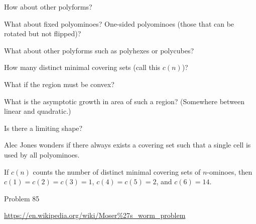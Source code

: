 \documentclass{article}
\begin{document}
\begin{related}
  \item How about other polyforms?
  \item What about fixed polyominoes? One-sided polyominoes (those that can be rotated but not flipped)?
  \item What about other polyforms such as polyhexes or polycubes?
  \item How many distinct minimal covering sets (call this $c(n)$)?
  \item What if the region must be convex?
  \item What is the asymptotic growth in area of such a region? (Somewhere between linear and quadratic.)
  \item Is there a limiting shape?
  \item Alec Jones wonders if there always exists a covering set such that a single
    cell is used by all polyominoes.
\end{related}

\begin{note}
  If $c(n)$ counts the number of distinct minimal covering sets of $n$-ominoes,
  then $c(1) = c(2) = c(3) = 1$, $c(4) = c(5) = 2$, and $c(6) = 14$.
\end{note}

\begin{references}
  \item Problem 85
  \item \url{https://en.wikipedia.org/wiki/Moser%27s_worm_problem}
\end{references}
\end{document}
